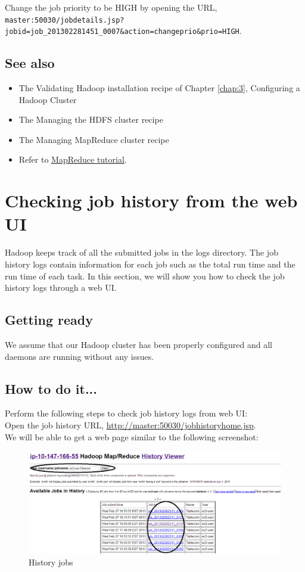 Change the job priority to be HIGH by opening the URL, \verb|master:50030/jobdetails.jsp?jobid=job_201302281451_0007&action=changeprio&prio=HIGH|. \\
\subsection*{See also}
\begin{itemize}
  \item The Validating Hadoop installation recipe of Chapter \ref{chap:3}, Configuring a Hadoop Cluster
  \item The Managing the HDFS cluster recipe
  \item The Managing MapReduce cluster recipe
  \item Refer to \href{http://hadoop.apache.org/docs/r1.1.2/mapred_tutorial.html}{MapReduce tutorial}.
\end{itemize}

\section{Checking job history from the web UI}
Hadoop keeps track of all the submitted jobs in the logs directory. The job history logs contain information for each job such as the total run time and the run time of each task. In this section, we will show you how to check the job history logs through a web UI.
\subsection*{Getting ready}
We assume that our Hadoop cluster has been properly configured and all daemons are running without any issues.
\subsection*{How to do it...}
Perform the following steps to check job history logs from web UI:\\ 

Open the job history URL, \url{http://master:50030/jobhistoryhome.jsp}. \\
We will be able to get a web page similar to the following screenshot:
\begin{figure}[h]
  \centering
  \includegraphics[width=\textwidth]{figs/5163os_04_01.png}
  \caption{History jobs}\label{fig:history.jobs}
\end{figure} 

